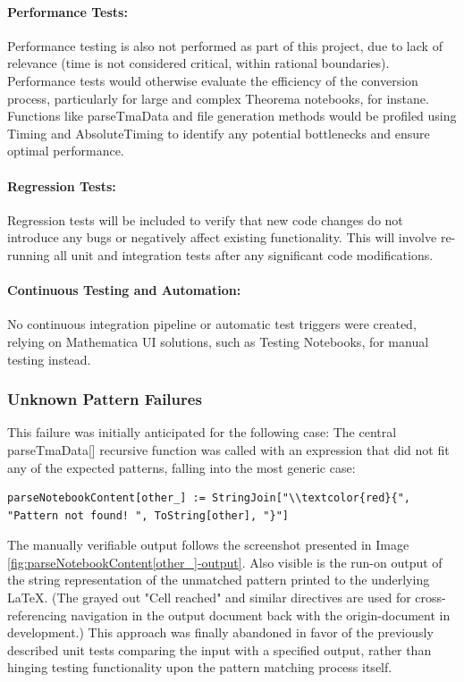 \paragraph{Performance Tests:}

Performance testing is also not performed as part of this project, due to lack of relevance (time is not considered critical, within rational boundaries). Performance tests would otherwise evaluate the efficiency of the conversion process, particularly for large and complex Theorema notebooks, for instane. Functions like parseTmaData and file generation methods would be profiled using Timing and AbsoluteTiming to identify any potential bottlenecks and ensure optimal performance. \cite{wolfram_research_inc_using_2024-1}

\paragraph{Regression Tests:}

Regression tests will be included to verify that new code changes do not introduce any bugs or negatively affect existing functionality. This will involve re-running all unit and integration tests after any significant code modifications.

\paragraph{Continuous Testing and Automation:}

No continuous integration pipeline or automatic test triggers were created, relying on Mathematica UI solutions, such as Testing Notebooks, for manual testing instead.

\subsubsection{Unknown Pattern Failures}

This failure was initially anticipated for the following case: The central parseTmaData[] recursive function was called with an expression that did not fit any of the expected patterns, falling into the most generic case:

\begin{verbatim}
parseNotebookContent[other_] := StringJoin["\\textcolor{red}{", "Pattern not found! ", ToString[other], "}"]
\end{verbatim}

The manually verifiable output follows the screenshot presented in Image \ref{fig:parseNotebookContent[other_]-output}. Also visible is the run-on output of the string representation of the unmatched pattern printed to the underlying \LaTeX. (The grayed out "Cell reached" and similar directives are used for cross-referencing navigation in the output document back with the origin-document in development.) This approach was finally abandoned in favor of the previously described unit tests comparing the input with a specified output, rather than hinging testing functionality upon the pattern matching process itself.

